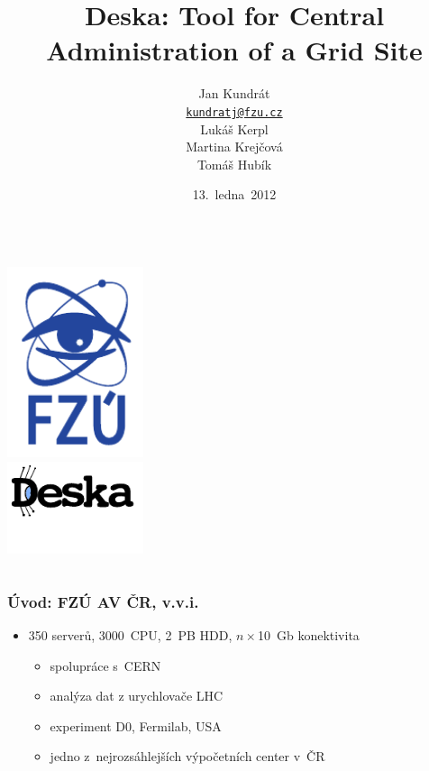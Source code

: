 \documentclass{beamer}
\begin{document}
\title{Deska: Tool for Central Administration of a Grid Site}
\author{Jan Kundrát \\ \href{mailto:kundratj@fzu.cz}{\nolinkurl{kundratj@fzu.cz}}
\vspace{5mm}
\\ Lukáš Kerpl \\ Martina Krejčová \\ Tomáš Hubík}
\date{13.~ledna~2012}
\begin{frame}
\begin{columns}
\begin{column}{.4\textwidth}
\includegraphics[width=4cm]{../HEPIX-2011/logo-FZU-male.pdf} \\
\includegraphics[width=4cm]{../HEPIX-2011/deska_logo.pdf}
\end{column}
\begin{column}{.6\textwidth}
\maketitle
\end{column}
\end{columns}
\end{frame}


\begin{frame}[fragile]
\frametitle{Úvod: FZÚ AV ČR, v.v.i.}
\begin{itemize}
    \item 350 serverů, 3000~CPU, 2~PB HDD, $n\times$10~Gb konektivita
        \begin{itemize}
            \item spolupráce s~CERN
            \item analýza dat z urychlovače LHC
            \item experiment D0, Fermilab, USA
            \item jedno z~nejrozsáhlejších výpočetních center v~ČR
        \end{itemize}
\end{itemize}
\end{frame}
\end{document}
